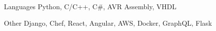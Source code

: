 
\begin{cvskills}
  \cvskill
    {Languages} %
    {Python, C/C++, C#, AVR Assembly, VHDL} %

  \cvskill
    {Other} %
    {Django, Chef, React, Angular, AWS, Docker, GraphQL, Flask} %
\end{cvskills}
